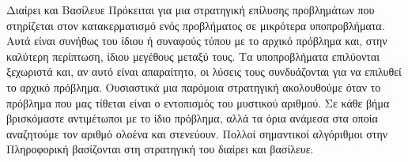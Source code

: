 \documentclass[a4paper,11pt,oneside]{book}
\begin{document}
\begin{theory}{Διαίρει και Βασίλευε}
Πρόκειται για μια στρατηγική επίλυσης προβλημάτων που στηρίζεται στον κατακερματισμό ενός προβλήματος σε μικρότερα υποπροβλήματα. Αυτά είναι συνήθως του ίδιου ή συναφούς τύπου με το αρχικό πρόβλημα και, στην καλύτερη περίπτωση, ίδιου μεγέθους μεταξύ τους. Τα υποπροβλήματα επιλύονται ξεχωριστά και, αν αυτό είναι απαραίτητο, οι λύσεις τους συνδυάζονται για να επιλυθεί το αρχικό πρόβλημα. Ουσιαστικά μια παρόμοια στρατηγική ακολουθούμε όταν το πρόβλημα που μας τίθεται είναι ο εντοπισμός του μυστικού αριθμού. Σε κάθε βήμα βρισκόμαστε αντιμέτωποι με το ίδιο πρόβλημα, αλλά τα όρια ανάμεσα στα οποία αναζητούμε τον αριθμό ολοένα και στενεύουν. Πολλοί σημαντικοί αλγόριθμοι στην Πληροφορική βασίζονται στη στρατηγική του διαίρει και βασίλευε.
\end{theory}


\hrulefill
\end{document}
